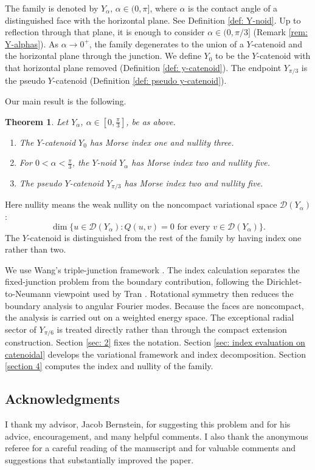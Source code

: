 \documentclass[11pt,twoside]{amsart}
\newtheorem{thm}{Theorem}[section]
\numberwithin{equation}{section}
\begin{document}
The family is denoted by $Y_\alpha$, $\alpha\in(0,\pi]$, where $\alpha$ is the contact angle of a distinguished face with the horizontal plane. See Definition \ref{def: Y-noid}. Up to reflection through that plane, it is enough to consider $\alpha\in(0,\pi/3]$ (Remark \ref{rem: Y-alphas}). As $\alpha\to0^+$, the family degenerates to the union of a $Y$-catenoid and the horizontal plane through the junction. We define $Y_0$ to be the $Y$-catenoid with that horizontal plane removed (Definition \ref{def: y-catenoid}). The endpoint $Y_{\pi/3}$ is the pseudo $Y$-catenoid (Definition \ref{def: pseudo y-catenoid}).

Our main result is the following.
\begin{thm} \label{thm: main result}
Let $Y_\alpha$, $\alpha \in [0,\tfrac{\pi}{3}]$, be as above.
\begin{enumerate}
    \item[(a)] The $Y$-catenoid $Y_0$ has Morse index one and nullity three.
    \item[(b)] For $0< \alpha < \tfrac{\pi}{3}$, the $Y$-noid $Y_\alpha$ has Morse index two and nullity five.
    \item[(c)] The pseudo $Y$-catenoid $Y_{\pi/3}$ has Morse index two and nullity five.
\end{enumerate}
\end{thm}
Here nullity means the weak nullity on the noncompact variational space $\mathcal D(Y_\alpha)$:
\[
\dim\{u\in\mathcal D(Y_\alpha):Q(u,v)=0\text{ for every }v\in\mathcal D(Y_\alpha)\}.
\]
The $Y$-catenoid is distinguished from the rest of the family by having index one rather than two.

We use Wang's triple-junction framework \cite{wang2022curvature}. The index calculation separates the fixed-junction problem from the boundary contribution, following the Dirichlet-to-Neumann viewpoint used by Tran \cite{tran2016index}. Rotational symmetry then reduces the boundary analysis to angular Fourier modes. Because the faces are noncompact, the analysis is carried out on a weighted energy space. The exceptional radial sector of $Y_{\pi/6}$ is treated directly rather than through the compact extension construction. Section \ref{sec: 2} fixes the notation. Section \ref{sec: index evaluation on catenoidal} develops the variational framework and index decomposition. Section \ref{section 4} computes the index and nullity of the family.

\subsection*{Acknowledgments}
I thank my advisor, Jacob Bernstein, for suggesting this problem and for his advice, encouragement, and many helpful comments. I also thank the anonymous referee for a careful reading of the manuscript and for valuable comments and suggestions that substantially improved the paper.
\end{document}
